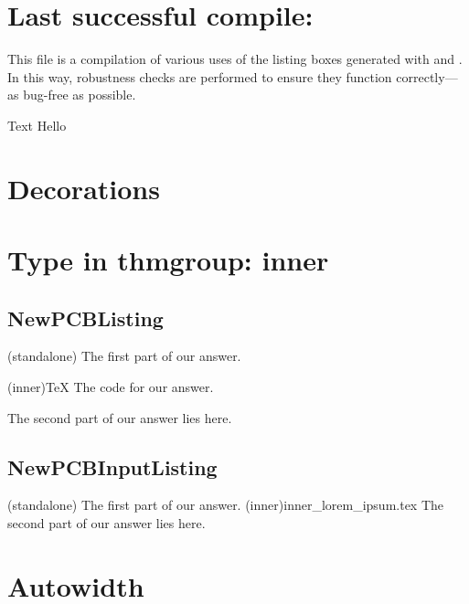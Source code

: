 \documentclass[11pt, titlepage, a4paper, oneside]{book}
\begin{document}
\frontmatter
\chapter*{Last successful compile: \DTMnow}

This file is a compilation of various uses of the listing boxes generated with  and . In this way, robustness checks are performed to ensure they function correctly---as bug-free as possible.
\begin{code}[debug=autowidth]{Text}
    Hello
\end{code}
%
\tableofcontents
\thispagestyle{empty}
\newpage
\setcounter{page}{1}
%
\mainmatter
\chapter{Decorations}


\chapter{Type in thmgroup: inner}
\section{NewPCBListing}
\begin{answer}(standalone)
    The first part of our answer.
    \begin{code}(inner){\TeX}
        The code for our answer.
    \end{code}
    \hspace{-\parindent-4mm} The second part of our answer lies here.
\end{answer}

\section{NewPCBInputListing}
\begin{answer}(standalone)
    The first part of our answer.
    (inner){inner_lorem_ipsum.tex}
    \hspace{-\parindent-4mm} The second part of our answer lies here.
\end{answer}

\chapter{Autowidth}
\end{document}
